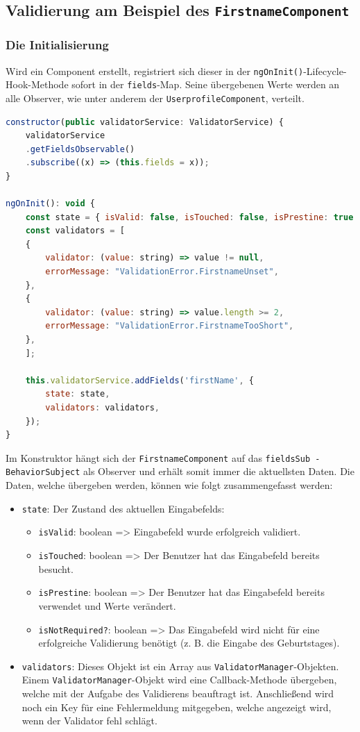\subsection{Validierung am Beispiel des \texttt{FirstnameComponent}}
\subsubsection{Die Initialisierung}
Wird ein Component erstellt, registriert sich dieser in der \texttt{ngOnInit()}-Lifecycle-Hook-Methode sofort in der \texttt{fields}-Map. Seine übergebenen Werte werden an alle Observer, wie unter anderem der \texttt{UserprofileComponent}, verteilt. 

\begin{lstlisting}[caption={Der Konstruktor und die \texttt{ngOnInit()}-Lifecycle-Hook-Methode des \texttt{FirstnameComponent}}, language=JavaScript]
constructor(public validatorService: ValidatorService) {
	validatorService
	.getFieldsObservable()
	.subscribe((x) => (this.fields = x));
}

ngOnInit(): void {
	const state = { isValid: false, isTouched: false, isPrestine: true };
	const validators = [
	{
		validator: (value: string) => value != null,
		errorMessage: "ValidationError.FirstnameUnset",
	},
	{
		validator: (value: string) => value.length >= 2,
		errorMessage: "ValidationError.FirstnameTooShort",
	},
	];
	
	this.validatorService.addFields('firstName', {
		state: state,
		validators: validators,
	});
}
\end{lstlisting}

Im Konstruktor hängt sich der \texttt{FirstnameComponent} auf das \texttt{fieldsSub - BehaviorSubject} als Observer und erhält somit immer die aktuellsten Daten. Die Daten, welche übergeben werden, können wie folgt zusammengefasst werden:

\begin{itemize}
	
	\item \texttt{state}: Der Zustand des aktuellen Eingabefelds:
		\begin{itemize}
			\item	\texttt{isValid}: boolean => Eingabefeld wurde erfolgreich validiert.
			\item	\texttt{isTouched}: boolean => Der Benutzer hat das Eingabefeld bereits besucht.
			\item	\texttt{isPrestine}: boolean => Der Benutzer hat das Eingabefeld bereits verwendet und Werte verändert.
			\item	\texttt{isNotRequired?}: boolean => Das Eingabefeld wird nicht für eine erfolgreiche Validierung benötigt (z. B. die Eingabe des Geburtstages).
		\end{itemize}
	\item \texttt{validators}: Dieses Objekt ist ein Array aus \texttt{ValidatorManager}-Objekten. Einem \texttt{ValidatorManager}-Objekt wird eine Callback-Methode übergeben, welche mit der Aufgabe des Validierens beauftragt ist. Anschließend wird noch ein Key für eine Fehlermeldung mitgegeben, welche angezeigt wird, wenn der Validator fehl schlägt. 
\end{itemize}

